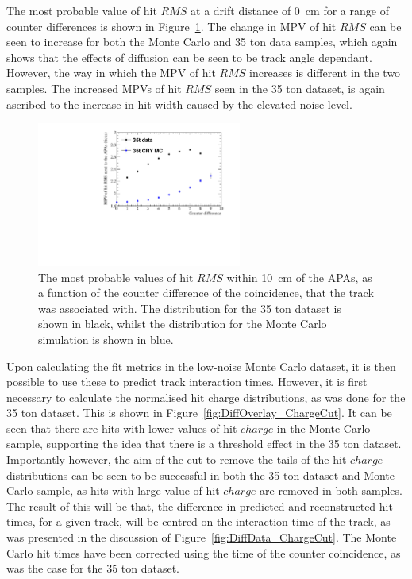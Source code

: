 The most probable value of hit $RMS$ at a drift distance of 0~cm for a range of counter differences is shown in Figure~\ref{fig:DiffMCDataCompInt}. The change in MPV of hit $RMS$ can be seen to increase for both the Monte Carlo and 35 ton data samples, which again shows that the effects of diffusion can be seen to be track angle dependant. However, the way in which the MPV of hit $RMS$ increases is different in the two samples. The increased MPVs of hit $RMS$ seen in the 35 ton dataset, is again ascribed to the increase in hit width caused by the elevated noise level. \\

\begin{figure}
  \centering
  \includegraphics[width=0.6\textwidth]{InterceptCanvasOverlay}
  \caption[The angular dependence of diffusion in the 35 ton dataset and Monte Carlo for hits within 10~cm of the APAs]
          {The most probable values of hit $RMS$ within 10~cm of the APAs, as a function of the counter difference of the coincidence, that the track was associated with. The distribution for the 35 ton dataset is shown in black, whilst the distribution for the Monte Carlo simulation is shown in blue.}
  \label{fig:DiffMCDataCompInt}
\end{figure}

Upon calculating the fit metrics in the low-noise Monte Carlo dataset, it is then possible to use these to predict track interaction times. However, it is first necessary to calculate the normalised hit charge distributions, as was done for the 35 ton dataset. This is shown in Figure~\ref{fig:DiffOverlay_ChargeCut}. It can be seen that there are hits with lower values of hit $charge$ in the Monte Carlo sample, supporting the idea that there is a threshold effect in the 35 ton dataset. Importantly however, the aim of the cut to remove the tails of the hit $charge$ distributions can be seen to be successful in both the 35 ton dataset and Monte Carlo sample, as hits with large value of hit $charge$ are removed in both samples. The result of this will be that, the difference in predicted and reconstructed hit times, for a given track, will be centred on the interaction time of the track, as was presented in the discussion of Figure~\ref{fig:DiffData_ChargeCut}. The Monte Carlo hit times have been corrected using the time of the counter coincidence, as was the case for the 35 ton dataset. \\ 

